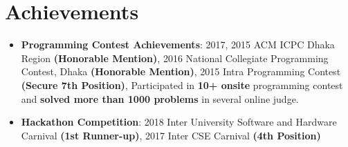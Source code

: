 \documentclass[letterpaper,11pt]{article}
\newcommand{\resumeSubHeadingListStart}{\begin{itemize}[leftmargin=*]}
\newcommand{\resumeSubHeadingListEnd}{\end{itemize}}
\begin{document}
\section{Achievements}
  \resumeSubHeadingListStart
    \item{
      \textbf{Programming Contest Achievements}{: 2017, 2015 ACM ICPC Dhaka Region }\textbf{(Honorable Mention)}{, 2016 National Collegiate Programming Contest, Dhaka }\textbf{(Honorable Mention)}{, 2015 Intra Programming Contest }\textbf{(Secure 7th Position)}{, Participated in }\textbf{10+ onsite}{ programming contest and }\textbf{solved more than 1000 problems}{ in several online judge.}
    }
    \item{
      \textbf{Hackathon Competition}{: 2018 Inter University Software and Hardware Carnival }\textbf{(1st Runner-up)}{, 2017 Inter CSE Carnival }\textbf{(4th Position)}
    }
  \resumeSubHeadingListEnd



\end{document}
